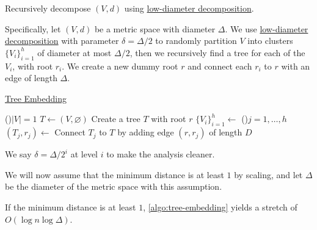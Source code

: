 \begin{intuition}
  Recursively decompose \((V, d)\) using \hyperref[def:low-diameter-decomposition]{low-diameter decomposition}.
\end{intuition}

Specifically, let \((V, d)\) be a metric space with diameter \(\Delta \). We use \hyperref[def:low-diameter-decomposition]{low-diameter decomposition} with parameter \(\delta = \Delta / 2\) to randomly partition \(V\) into clusters \(\{ V_i \} _{i=1}^{h}\) of diameter at most \(\Delta / 2\), then we recursively find a tree for each of the \(V_i\), with root \(r_i\). We create a new dummy root \(r\) and connect each \(r_i\) to \(r\) with an edge of length \(\Delta \).

\begin{algorithm}[H]\label{algo:tree-embedding}
  \DontPrintSemicolon{}
  \caption{\hyperref[prb:tree-embedding]{Tree Embedding}}

  \BlankLine

  \If(){\(\lvert V \rvert = 1\)}{
    \(T \gets (V, \varnothing )\)\;
  }
  \;
  Create a tree \(T\) with root \(r\)\;
  \(\{ V_i \} _{i=1}^{h} \gets\)\;
  \For(){\(j = 1, \dots , h\)}{
    \((T_j, r_j)\gets\)\;
    Connect \(T_j\) to \(T\) by adding edge \((r, r_j)\) of length \(D\)\;
  }
  \;
\end{algorithm}

\begin{center}
\end{center}

\begin{notation}
  We say \(\delta = \Delta / 2^i\) at level \(i\) to make the analysis cleaner.
\end{notation}

We will now assume that the minimum distance is at least \(1\) by scaling, and let \(\Delta \) be the diameter of the metric space with this assumption.

\begin{remark}
  If the minimum distance is at least \(1\), \autoref{algo:tree-embedding} yields a stretch of \(O(\log n \log \Delta )\).
\end{remark}

